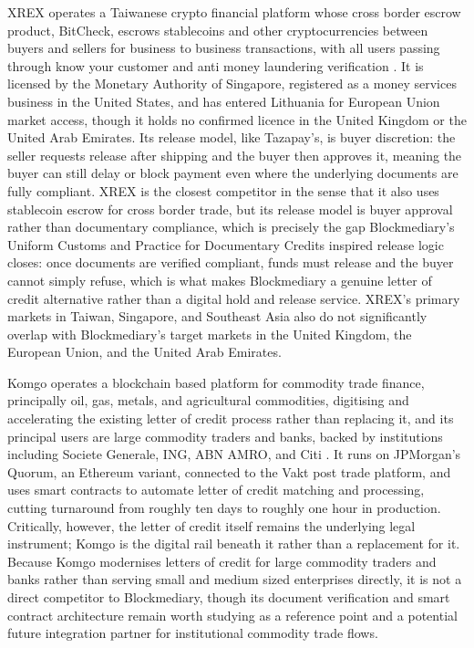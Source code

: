 \documentclass[12pt, a4paper]{article}
\begin{document}
XREX operates a Taiwanese crypto financial platform whose cross border escrow product,
BitCheck, escrows stablecoins and other cryptocurrencies between buyers and sellers for
business to business transactions, with all users passing through know your customer and
anti money laundering verification \citep{xrex2025}. It is licensed by the Monetary
Authority of Singapore, registered as a money services business in the United States, and
has entered Lithuania for European Union market access, though it holds no confirmed
licence in the United Kingdom or the United Arab Emirates. Its release model, like
Tazapay's, is buyer discretion: the seller requests release after shipping and the buyer
then approves it, meaning the buyer can still delay or block payment even where the
underlying documents are fully compliant. XREX is the closest competitor in the sense that
it also uses stablecoin escrow for cross border trade, but its release model is buyer
approval rather than documentary compliance, which is precisely the gap Blockmediary's
Uniform Customs and Practice for Documentary Credits inspired release logic closes: once
documents are verified compliant, funds must release and the buyer cannot simply refuse,
which is what makes Blockmediary a genuine letter of credit alternative rather than a
digital hold and release service. XREX's primary markets in Taiwan, Singapore, and
Southeast Asia also do not significantly overlap with Blockmediary's target markets in the
United Kingdom, the European Union, and the United Arab Emirates.

Komgo operates a blockchain based platform for commodity trade finance, principally oil,
gas, metals, and agricultural commodities, digitising and accelerating the existing letter
of credit process rather than replacing it, and its principal users are large commodity
traders and banks, backed by institutions including Societe Generale, ING, ABN AMRO, and
Citi \citep{komgo2020}. It runs on JPMorgan's Quorum, an Ethereum variant, connected to the
Vakt post trade platform, and uses smart contracts to automate letter of credit matching
and processing, cutting turnaround from roughly ten days to roughly one hour in production.
Critically, however, the letter of credit itself remains the underlying legal instrument;
Komgo is the digital rail beneath it rather than a replacement for it. Because Komgo
modernises letters of credit for large commodity traders and banks rather than serving
small and medium sized enterprises directly, it is not a direct competitor to
Blockmediary, though its document verification and smart contract architecture remain
worth studying as a reference point and a potential future integration partner for
institutional commodity trade flows.
\end{document}
